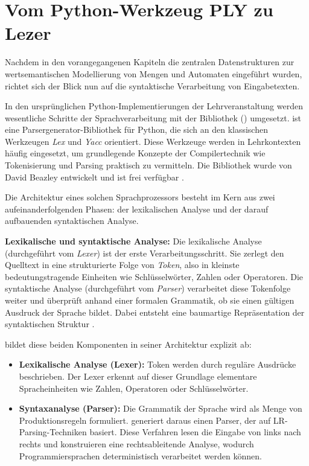 \section{Vom Python-Werkzeug PLY zu Lezer}
\label{sec:ply_to_lezer}

Nachdem in den vorangegangenen Kapiteln die zentralen Datenstrukturen zur wertsemantischen Modellierung von Mengen und Automaten eingeführt wurden, richtet sich der Blick nun auf die syntaktische Verarbeitung von Eingabetexten.

In den ursprünglichen Python-Implementierungen der Lehrveranstaltung werden wesentliche Schritte der Sprachverarbeitung mit der Bibliothek \emph{} () umgesetzt. \emph{} ist eine Parsergenerator-Bibliothek für Python, die sich an den klassischen Werkzeugen \emph{Lex} und \emph{Yacc} orientiert. Diese Werkzeuge werden in Lehrkontexten häufig eingesetzt, um grundlegende Konzepte der Compilertechnik wie Tokenisierung und Parsing praktisch zu vermitteln. Die Bibliothek wurde von David Beazley entwickelt und ist frei verfügbar \autocite{beazley_ply}.

Die Architektur eines solchen Sprachprozessors besteht im Kern aus zwei aufeinanderfolgenden Phasen: der lexikalischen Analyse und der darauf aufbauenden syntaktischen Analyse.

\begin{definition}
\label{def:lexer-parser}
\textbf{Lexikalische und syntaktische Analyse:}
Die lexikalische Analyse (durchgeführt vom \textit{Lexer}) ist der erste Verarbeitungsschritt. Sie zerlegt den Quelltext in eine strukturierte Folge von \textit{Token}, also in kleinste bedeutungstragende Einheiten wie Schlüsselwörter, Zahlen oder Operatoren. Die syntaktische Analyse (durchgeführt vom \textit{Parser}) verarbeitet diese Tokenfolge weiter und überprüft anhand einer formalen Grammatik, ob sie einen gültigen Ausdruck der Sprache bildet. Dabei entsteht eine baumartige Repräsentation der syntaktischen Struktur \autocite[5f]{aho2006compilers}.
\end{definition}

\emph{} bildet diese beiden Komponenten in seiner Architektur explizit ab:

\begin{itemize}
    \item \textbf{Lexikalische Analyse (Lexer):}  
    Token werden durch reguläre Ausdrücke beschrieben. Der Lexer erkennt auf dieser Grundlage elementare Spracheinheiten wie Zahlen, Operatoren oder Schlüsselwörter.

    \item \textbf{Syntaxanalyse (Parser):}  
    Die Grammatik der Sprache wird als Menge von Produktionsregeln formuliert. \emph{} generiert daraus einen Parser, der auf LR-Parsing-Techniken basiert. Diese Verfahren lesen die Eingabe von links nach rechts und konstruieren eine rechtsableitende Analyse, wodurch Programmiersprachen deterministisch verarbeitet werden können.
\end{itemize}

